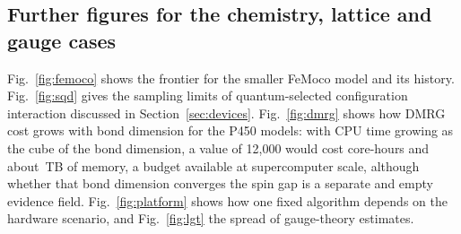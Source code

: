 \documentclass[10pt,a4paper]{article}
\begin{document}
\subsection{Further figures for the chemistry, lattice and gauge cases}
Fig.~\ref{fig:femoco} shows the frontier for the smaller FeMoco model and its history. Fig.~\ref{fig:sqd} gives the sampling limits of quantum-selected configuration interaction discussed in Section~\ref{sec:devices}. Fig.~\ref{fig:dmrg} shows how DMRG cost grows with bond dimension for the P450 models: with CPU time growing as the cube of the bond dimension, a value of 12{,}000 would cost \planCoreH{} core-hours and about \planMemTB\,TB of memory, a budget available at supercomputer scale, although whether that bond dimension converges the spin gap is a separate and empty evidence field. Fig.~\ref{fig:platform} shows how one fixed algorithm depends on the hardware scenario, and Fig.~\ref{fig:lgt} the spread of gauge-theory estimates.
\end{document}
